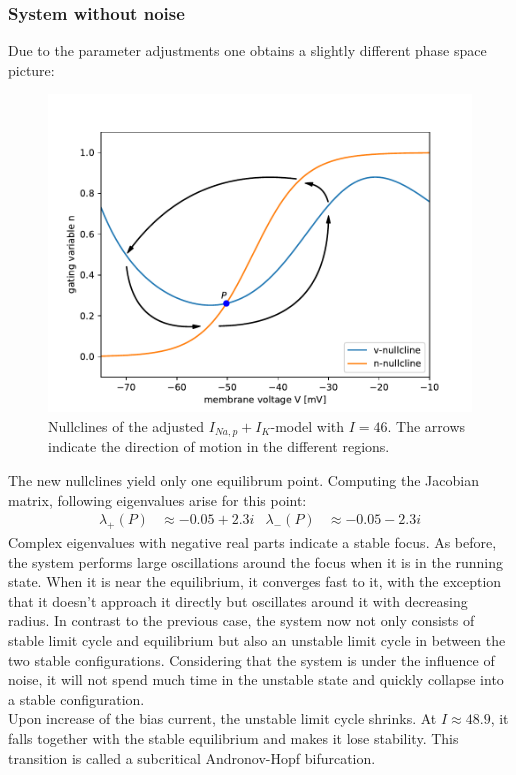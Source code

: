 \documentclass[12pt,a4paper]{article}
\begin{document}
\subsubsection{System without noise}
Due to the parameter adjustments one obtains a slightly different phase space picture:
\begin{figure}[H]
	\centering
	\includegraphics[scale=0.5]{inapikanhopfnc.pdf}\caption{Nullclines of the adjusted $I_{Na,p}+I_K$-model with $I=46$. The arrows indicate the direction of motion in the different regions.}
	\label{anhopfnc}
\end{figure}
The new nullclines yield only one equilibrum point. Computing the Jacobian matrix, following eigenvalues arise for this point:
\begin{align*}
\lambda_+(P)&\approx -0.05 + 2.3i& \lambda_-(P)&\approx -0.05 - 2.3i
\end{align*}
Complex eigenvalues with negative real parts indicate a stable focus. As before, the system performs large oscillations around the focus when it is in the running state. When it is near the equilibrium, it converges fast to it, with the exception that it doesn't approach it directly but oscillates around it with decreasing radius.
In contrast to the previous case, the system now not only consists of stable limit cycle and equilibrium but also an unstable limit cycle in between the two stable configurations. Considering that the system is under the influence of noise, it will not spend much time in the unstable state and quickly collapse into a stable configuration.\\
Upon increase of the bias current, the unstable limit cycle shrinks. At $I\approx 48.9$, it falls together with the stable equilibrium and makes it lose stability. This transition is called a subcritical Andronov-Hopf bifurcation.\\
\end{document}
